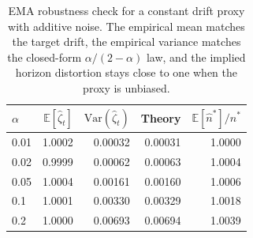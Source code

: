 \begin{table}[!htbp]
\centering
\small
\caption{EMA robustness check for a constant drift proxy with additive noise. The empirical mean matches the target drift, the empirical variance matches the closed-form $\alpha/(2-\alpha)$ law, and the implied horizon distortion stays close to one when the proxy is unbiased.}
\label{tab:zeta_robustness}
\begin{tabular}{lrrrr}
\toprule
$\alpha$ & $\mathbb E[\widehat\zeta_t]$ & $\mathrm{Var}(\widehat\zeta_t)$ & Theory & $\mathbb E[\widehat n^*]/n^*$ \\
\midrule
0.01 & 1.0002 & 0.00032 & 0.00031 & 1.0000 \\
0.02 & 0.9999 & 0.00062 & 0.00063 & 1.0004 \\
0.05 & 1.0004 & 0.00161 & 0.00160 & 1.0006 \\
0.1 & 1.0001 & 0.00330 & 0.00329 & 1.0018 \\
0.2 & 1.0000 & 0.00693 & 0.00694 & 1.0039 \\
\bottomrule
\end{tabular}
\end{table}

